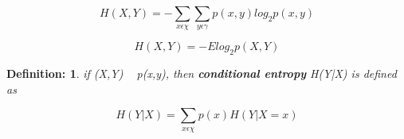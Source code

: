 \documentclass[11pt]{article}
\newtheorem{defn}{Definition:}
\begin{document}
\begin{equation}
H(X,Y) = - \sum \limits_{x \epsilon \chi} \sum \limits_{y \epsilon \gamma} p(x,y)log_{2} p(x,y) 
\end{equation}

\begin{equation}
H(X,Y)=-Elog_{2}p(X,Y)
\end{equation}

\begin{defn}
if (X,Y) ~ p(x,y), then \textbf{conditional entropy} H(Y|X) is defined as
\end{defn}

\begin{equation}
H(Y|X)=\sum \limits_{x \epsilon \chi} p(x) H(Y|X=x)
\end{equation}
\end{document}
